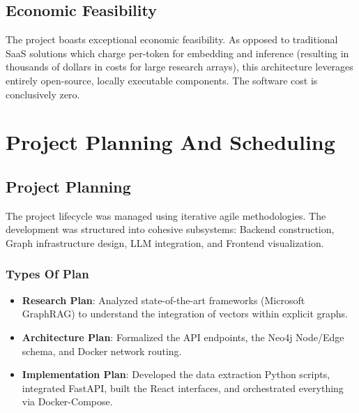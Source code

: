 \documentclass[12pt,a4paper]{report}
\begin{document}
\subsection{Economic Feasibility}
The project boasts exceptional economic feasibility. As opposed to traditional SaaS solutions which charge per-token for embedding and inference (resulting in thousands of dollars in costs for large research arrays), this architecture leverages entirely open-source, locally executable components. The software cost is conclusively zero.

\section{Project Planning And Scheduling}

\subsection{Project Planning}
The project lifecycle was managed using iterative agile methodologies. The development was structured into cohesive subsystems: Backend construction, Graph infrastructure design, LLM integration, and Frontend visualization.
\subsubsection*{Types Of Plan}
\begin{itemize}
    \item \textbf{Research Plan}: Analyzed state-of-the-art frameworks (Microsoft GraphRAG) to understand the integration of vectors within explicit graphs.
    \item \textbf{Architecture Plan}: Formalized the API endpoints, the Neo4j Node/Edge schema, and Docker network routing.
    \item \textbf{Implementation Plan}: Developed the data extraction Python scripts, integrated FastAPI, built the React interfaces, and orchestrated everything via Docker-Compose.
\end{itemize}
\end{document}
